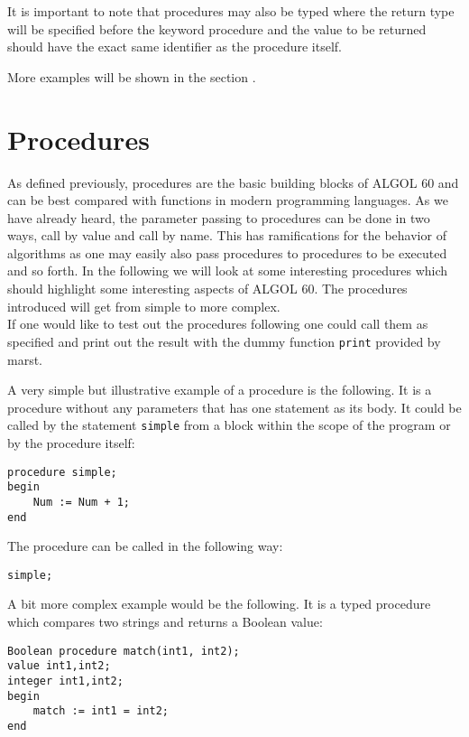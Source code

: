 \documentclass{article}
\begin{document}
It is important to note that procedures may also be typed where the return type will be specified before the keyword procedure and the value to be returned should have the exact same identifier as the procedure itself.

More examples will be shown in the section .

\newpage

\section{Procedures} \label{procedures}
As defined previously, procedures are the basic building blocks of ALGOL 60 and can be best compared with functions in modern programming languages. As we have already heard, the parameter passing to procedures can be done in two ways, call by value and call by name. This has ramifications for the behavior of algorithms as one may easily also pass procedures to procedures to be executed and so forth. In the following we will look at some interesting procedures which should highlight some interesting aspects of ALGOL 60. The procedures introduced will get from simple to more complex. \\

If one would like to test out the procedures following one could call them as specified and print out the result with the dummy function \texttt{print} provided by marst.

A very simple but illustrative example of a procedure is the following. It is a procedure without any parameters that has one statement as its body. It could be called by the statement \texttt{simple} from a block within the scope of the program or by the procedure itself:\\

\begin{lstlisting}[language={[60]algol}]
procedure simple;
begin
    Num := Num + 1;
end
\end{lstlisting}

The procedure can be called in the following way:

\begin{lstlisting}[language={[60]algol}]
simple;
\end{lstlisting}

A bit more complex example would be the following. It is a typed procedure which compares two strings and returns a Boolean value:\\

\begin{lstlisting}[language={[60]algol}]
Boolean procedure match(int1, int2);
value int1,int2;
integer int1,int2;
begin
    match := int1 = int2;
end
\end{lstlisting}
\end{document}
